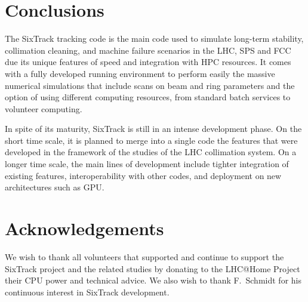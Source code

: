 \documentclass{ws-ijmpa}
\begin{document}
\section{Conclusions}

The SixTrack tracking code is the main code used to simulate long-term stability, collimation cleaning, and machine failure scenarios in the LHC, SPS and FCC due its unique features of speed and integration with HPC resources. It comes with a fully developed running environment to perform easily the massive numerical simulations that include scans on beam and ring parameters and the option of using different computing resources, from standard batch services to volunteer computing. 

In spite of its maturity, SixTrack is still in an intense development phase. On the short time scale, it is planned to merge into a single code the features that were developed in the framework of the studies of the LHC collimation system. On a longer time scale, the main lines of development include  tighter integration of existing features, interoperability with other codes, and deployment on new architectures such as GPU.

\section{Acknowledgements}

We wish to thank all volunteers that supported and continue to support the SixTrack project and the related studies by donating  to the LHC@Home Project their CPU power and technical advice. We also wish to thank F.~Schmidt for his continuous interest in SixTrack development.
\end{document}
